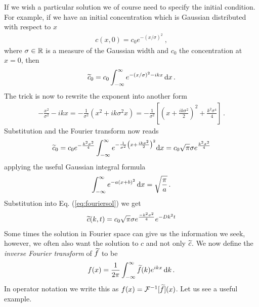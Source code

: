 If we wish a particular solution we of course need to specify the initial condition. For example, if we have an initial concentration 
which is Gaussian distributed with respect to $x$ 
\begin{eqnarray}
	\label{eq:initRealUnbounded}
	c(x, 0) = c_0 e^{-(x/\sigma)^2} \ , 
\end{eqnarray}
where $\sigma \in \mathbb{R}$ is a measure of the Gaussian width and $c_0$ the concentration at $x=0$, then 
\begin{eqnarray}
	\widetilde{c}_0 = c_0 \int_{-\infty}^\infty e^{-(x/\sigma)^2 - ikx} \, \mathrm{d} x \, .
\end{eqnarray}
The trick is now to rewrite the exponent into another form
\begin{eqnarray}
	-\frac{x^2}{\sigma^2} - ikx  = -\frac{1}{\sigma^2} \left(x^2 + ik\sigma^2x \right)=  -\frac{1}{\sigma^2} 
	\left[ \left(x + \frac{ik\sigma^2}{2} \right)^2 + \frac{k^2\sigma^4}{4} \right] \, .
\end{eqnarray}
Substitution and the Fourier transform now reads
\begin{eqnarray}
	\widetilde{c}_0 = c_0 e^{-\frac{k^2\sigma^2}{4}} \int_{-\infty}^\infty e^{-\frac{1}{\sigma^2}\left(x + \frac{ik\sigma^2}{2} \right)^2} \mathrm{d} x = 
	c_0 \sqrt{\pi} \sigma  e^{\frac{k^2\sigma^2}{4}} 
\end{eqnarray}
applying the useful Gaussian integral formula
\begin{eqnarray}
	\int_{-\infty}^\infty e^{-a(x+b)^2} \, \mathrm{d} x = \sqrt{\frac{\pi}{a}} \, .
\end{eqnarray}
Substitution into Eq. (\ref{eq:fouriersol}) we get 
\begin{eqnarray}
	\label{eq:fouriersolc}
	\widetilde{c}(k,t)=c_0 \sqrt{\pi} \sigma  e^{\frac{-k^2\sigma^2}{4}}   e^{-Dk^2t}
\end{eqnarray}
Some times the solution in Fourier space can give us the information we seek, however, we often also want 
the solution to $c$ and not only $\widetilde{c}$. We now define the \emph{inverse Fourier transform} of $\widetilde{f}$ 
to be 
\begin{eqnarray}
	f(x) = \frac{1}{2\pi} \int_{-\infty}^\infty \widetilde{f}(k) e^{ikx} \, \mathrm{d} k \, .
\end{eqnarray}
In operator notation we write this as $f(x) = \mathcal{F}^{-1}[\widetilde{f}](x)$. 
Let us see a useful example. 
